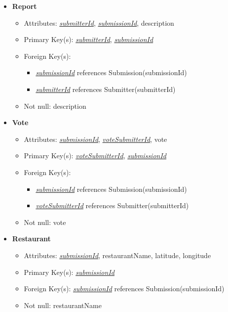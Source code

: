 \documentclass{article}
\begin{document}
\begin{itemize}
        \item \textbf{Report}
        \begin{itemize}
            \item Attributes: \underline{\textit{submitterId}}, \underline{\textit{submissionId}}, description
            \item Primary Key(s): \underline{\textit{submitterId}}, \underline{\textit{submissionId}}
            \item Foreign Key(s): 
            \begin{itemize}
                \item \underline{\textit{submissionId}} references Submission(submissionId)
                \item \underline{\textit{submitterId}} references Submitter(submitterId)
            \end{itemize}
            \item Not null: description
        \end{itemize}

        \item \textbf{Vote}
        \begin{itemize}
            \item Attributes: \underline{\textit{submissionId}}, \underline{\textit{voteSubmitterId}}, vote
            \item Primary Key(s): \underline{\textit{voteSubmitterId}}, \underline{\textit{submissionId}}
            \item Foreign Key(s): 
                \begin{itemize}
                    \item \underline{\textit{submissionId}} references Submission(submissionId)
                    \item \underline{\textit{voteSubmitterId}} references Submitter(submitterId)
                \end{itemize}
            \item Not null: vote
        \end{itemize}

        \item \textbf{Restaurant}
        \begin{itemize}
            \item Attributes: \underline{\textit{submissionId}}, restaurantName, latitude, longitude
            \item Primary Key(s): \underline{\textit{submissionId}}
            \item Foreign Key(s): \underline{\textit{submissionId}} references Submission(submissionId)
            \item Not null: restaurantName
        \end{itemize}
    

\end{itemize}
\end{document}
